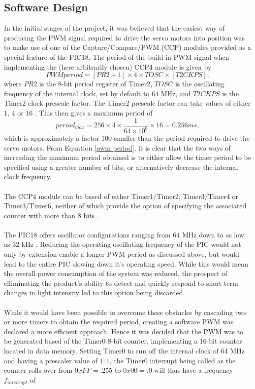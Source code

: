 \documentclass[journal]{Imperial_lab_report}
\begin{document}
\subsection{Software Design}
In the initial stages of the project, it was believed that the easiest way of producing the PWM signal required to drive the servo motors into position was to make use of one of the Capture/Compare/PWM (CCP) modules provided as a special feature of the PIC18. The period of the build-in PWM signal when implementing the (here arbitrarily chosen) CCP4 module is given by
\begin{equation}
\label{pwm period}
PWM period = [PR2 + 1] \times 4 \times TOSC \times [T2CKPS] , 
\end{equation}
where $PR2$ is the 8-bit period register of Timer2, $TOSC$ is the oscillating frequency of the internal clock, set by default to $64$ MHz, and $T2CKPS$ is the Timer2 clock prescale factor. The Timer2 prescale factor can take values of either $1$, $4$ or $16$ \cite{pic datasheet}. This then gives a maximum period of 
\begin{equation}
period_{max} = 256 \times 4 \times \frac{1}{64 \times 10^{6}} \times 16 = 0.256 ms ,
\end{equation}
which is approximately a factor $100$ smaller than the period required to drive the servo motors. From Equation \ref{pwm period}, it is clear that the two ways of increading the maximum period obtained is to either allow the timer period to be specified using a greater number of bits, or alternatively decrease the internal clock frequency. 
\\
\\The CCP4 module can be based of either Timer1/Timer2, Timer3/Timer4 or Timer3/Timer6, neither of which provide the option of specifying the associated counter with more than 8 bits \cite{pic datasheet}. 
\\
\\The PIC18 offers oscillator configurations ranging from $64$ MHz down to as low as $32$ kHz \cite{pic datasheet}. Reducing the operating oscillating frequency of the PIC would not only by extension enable a longer PWM period as discussed above, but would lead to the entire PIC slowing down it's operating speed. While this would mean the overall power consumption of the system was reduced, the prospect of elliminating the product's ability to detect and quickly respond to short term changes in light intensity led to this option being discarded. 
\\
\\While it would have been possible to overcome these obstacles by cascading two or more timers to obtain the required period, creating a software PWM was declared a more efficient approach. Hence it was decided that the PWM was to be generated based of the Timer0 8-bit counter, implementing a 16-bit counter located in data memory. Setting Timer0 to run off the internal clock of $64$ MHz and having a prescaler value of $1:1$, the Timer0 interrupt being called as the counter rolls over from $0xFF=.255$ to $0x00=.0$ will thus have a frequency $f_{interrupt}$ of 
\end{document}
